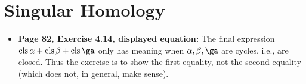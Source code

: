 \documentclass{article}
\DeclareMathOperator\cls{cls}
\newcommand*\loc[1]{\textbf{#1:}}
\begin{document}
\section{Singular Homology} 
\begin{itemize}
\item \loc{Page 82, Exercise 4.14, displayed equation}
The final expression $\cls\alpha+\cls\beta+\cls\ga$ only has meaning when $\alpha,\beta,\ga$ are cycles, i.e., are closed. 
Thus the exercise is to show the first equality, not the second equality (which does not, in general, make sense). 
\end{itemize}
\end{document}
